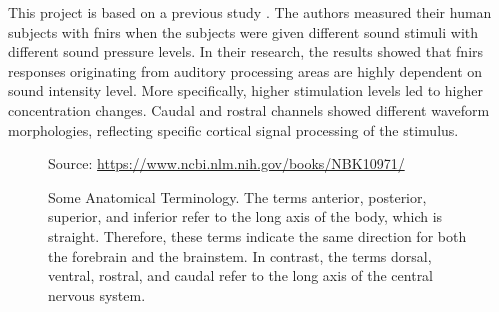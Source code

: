 This project is based on a previous study \cite{Weder2018}. The authors measured their human subjects with  \acrshort{fnirs} when the subjects were given different sound stimuli with different sound pressure levels. In their research, the results showed that  \acrshort{fnirs} responses originating from auditory processing areas are highly dependent on sound intensity level. More specifically, higher stimulation levels led to higher concentration changes. Caudal and rostral channels showed different waveform morphologies, reflecting specific cortical signal processing of the stimulus. 

\begin{figure}[h]
  \centering
           {Source: \url{https://www.ncbi.nlm.nih.gov/books/NBK10971/}}
   
  \caption{Some Anatomical Terminology. The terms anterior, posterior, superior, and inferior refer to the long axis of the body, which is straight. Therefore, these terms indicate the same direction for both the forebrain and the brainstem. In contrast, the terms dorsal, ventral, rostral, and caudal refer to the long axis of the central nervous system.}
\end{figure}



